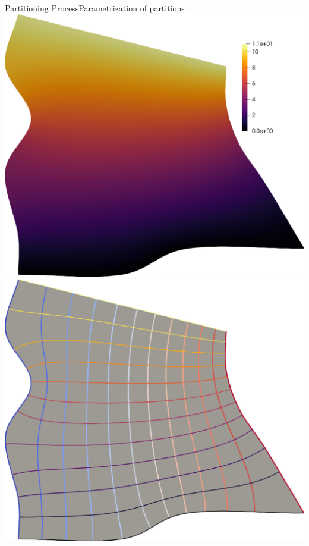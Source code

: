 \documentclass[compress,10pt,aspectratio=169]{beamer}
\begin{document}
\begin{frame}{Partitioning Process}{Parametrization of partitions}
{\includegraphics[scale=0.1]{images/quad_equation_2.pdf}\hspace{0.2cm}
\includegraphics[scale=0.1]{images/quad_equation_3.pdf}\hspace{0.2cm}
}
\end{frame}
\end{document}

